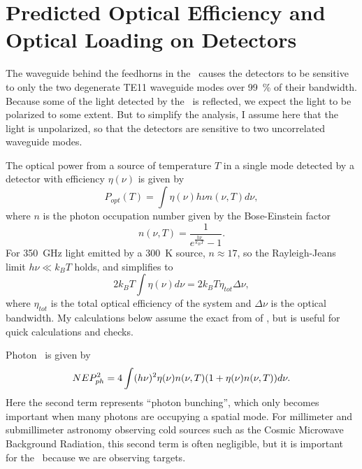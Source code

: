\section{Predicted Optical Efficiency and Optical Loading on Detectors} \label{sec:ch4-opt-eff}

The waveguide behind the feedhorns in the \Imager\ causes the detectors to be sensitive to only the two degenerate TE11 waveguide modes over \SI{99}{\percent} of their bandwidth.
Because some of the light detected by the \Imager\ is reflected, we expect the light to be polarized to some extent.
But to simplify the analysis, I assume here that the light is unpolarized, so that the detectors are sensitive to two uncorrelated waveguide modes.

The optical power from a source of temperature $T$ in a single mode detected by a detector with efficiency $\eta(\nu)$ is given by \cite{zmuidzinas_thermal_2003}
\begin{equation} \label{eqn:ch4-power-per-mode}
  P_{opt}(T) = \int \eta(\nu) h \nu n(\nu,T) d \nu ,
\end{equation}
where $n$ is the photon occupation number given by the Bose-Einstein factor
\begin{equation} \label{eqn:ch4-photon-n}
  n(\nu,T) = \frac{1}{e^{\frac{h \nu}{k_B T}} -1}.
\end{equation}
For \SI{350}{\GHz} light emitted by a \SI{300}{\K} source, $n \approx 17$, so the Rayleigh-Jeans limit $h \nu \ll k_B T$ holds, and  simplifies to
\begin{equation} \label{eqn:ch4-power-per-mode-rj}
  2 k_B T \int \eta(\nu) d \nu = 2 k_B T \eta_{tot} \Delta \nu,
\end{equation}
where $\eta_{tot}$ is the total optical efficiency of the system and $\Delta \nu$ is the optical bandwidth.
My calculations below assume the exact from of , but  is useful for quick calculations and checks.

Photon \NEP\ is given by \cite[Equation~51]{zmuidzinas_thermal_2003}
\begin{equation} \label{eqn:ch4-photon-nep}
  NEP_{ph}^2 = 4 \int (h \nu)^2 \eta(\nu) n(\nu,T) (1 + \eta(\nu) n(\nu,T)) d \nu.
\end{equation}
Here the second term represents ``photon bunching'', which only becomes important when many photons are occupying a spatial mode.
For millimeter and submillimeter astronomy observing cold sources such as the Cosmic Microwave Background Radiation, this second term is often negligible, but it is important for the \Imager\ because we are observing  targets.

